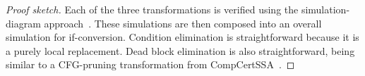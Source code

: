 \begin{theorem}
  \begin{proof}[Proof sketch]
    Each of the three transformations is verified using the simulation-diagram
    approach~\cite[p.~379]{leroy09_formal_verif_compil_back_end}. These
    simulations are then composed into an overall simulation for if-conversion.
    Condition elimination is straightforward because it is a purely local
    replacement. %
    Dead block elimination is also straightforward, being similar to a
    CFG-pruning transformation from
    CompCertSSA~\cite{barthe14_formal_verif_ssa_based_middl_end_compc}.


\end{proof}
\end{theorem}
